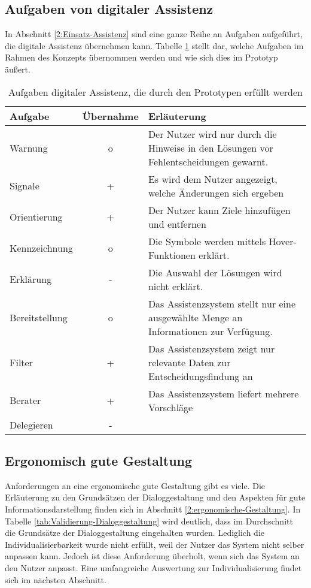 \subsection*{Aufgaben von digitaler Assistenz}
In Abschnitt \ref{2:Einsatz-Assistenz} sind eine ganze Reihe an Aufgaben aufgeführt, die digitale Assistenz übernehmen kann. Tabelle \ref{tab:Aufgaben-Assistenz-Prototyp} stellt dar, welche Aufgaben im Rahmen des Konzepts übernommen werden und wie sich dies im Prototyp äußert. 

\begin{table}
\caption{Aufgaben digitaler Assistenz, die durch den Prototypen erfüllt werden}
\centering
\begin{tabular}{l|c|p{}}
\textbf{Aufgabe} & \textbf{Übernahme} & \textbf{Erläuterung} \\
\hline
Warnung & o & Der Nutzer wird nur durch die Hinweise in den Lösungen vor Fehlentscheidungen gewarnt.\\
\hline
Signale & + & Es wird dem Nutzer angezeigt, welche Änderungen sich ergeben\\
\hline
Orientierung & + & Der Nutzer kann Ziele hinzufügen und entfernen \\
\hline
Kennzeichnung & o & Die Symbole werden mittels Hover-Funktionen erklärt.\\
\hline
Erklärung & - & Die Auswahl der Lösungen wird nicht erklärt.\\
\hline
Bereitstellung & o & Das Assistenzsystem stellt nur eine ausgewählte Menge an Informationen zur Verfügung.\\
\hline
Filter & + & Das Assistenzsystem zeigt nur relevante Daten zur Entscheidungsfindung an \\
\hline
Berater & + & Das Assistenzsystem liefert mehrere Vorschläge \\
\hline
Delegieren & - & \\
\end{tabular}
\label{tab:Aufgaben-Assistenz-Prototyp}
\end{table}

\subsection*{Ergonomisch gute Gestaltung}
Anforderungen an eine ergonomische gute Gestaltung gibt es viele. Die Erläuterung zu den Grundsätzen der Dialoggestaltung und den Aspekten für gute Informationsdarstellung finden sich in Abschnitt \ref{2:ergonomische-Gestaltung}. In Tabelle \ref{tab:Validierung-Dialoggestaltung} wird deutlich, dass im Durchschnitt die Grundsätze der Dialoggestaltung eingehalten wurden. Lediglich die Individualisierbarkeit wurde nicht erfüllt, weil der Nutzer das System nicht selber anpassen kann. Jedoch ist diese Anforderung überholt, wenn sich das System an den Nutzer anpasst. Eine umfangreiche Auswertung zur Individualisierung findet sich im nächsten Abschnitt.

